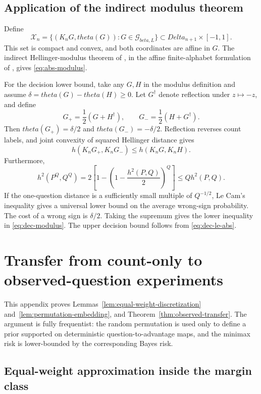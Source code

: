 \documentclass[11pt]{article}
\def\beta{beta}%
\def\theta{theta}%
\def\Delta{Delta}%
\newcommand{\calG}{\mathcal G}
\begin{document}
\subsection{Application of the indirect modulus theorem}

Define
\[
\mathcal X_n
=
\{(K_nG,\theta(G)):G\in\calG_{\beta,L}\}
\subset\Delta_{n+1}\times[-1,1].
\]
This set is compact and convex, and both coordinates are affine in $G$.  The indirect Hellinger-modulus theorem of \citet{DonohoLiuII}, in the affine finite-alphabet formulation of \citet{JuditskyNemirovski}, gives \eqref{eq:abs-modulus}.

For the decision lower bound, take any $G,H$ in the modulus definition and assume $\delta=\theta(G)-\theta(H)\ge0$.  Let $G^\dagger$ denote reflection under $z\mapsto-z$, and define
\[
G_+=\frac12(G+H^\dagger),
\qquad
G_-=\frac12(H+G^\dagger).
\]
Then $\theta(G_+)=\delta/2$ and $\theta(G_-)=-\delta/2$.  Reflection reverses count labels, and joint convexity of squared Hellinger distance gives
\[
h(K_nG_+,K_nG_-)
\le h(K_nG,K_nH).
\]
Furthermore,
\[
h^2(P^Q,Q^Q)
=2\left[1-\left(1-\frac{h^2(P,Q)}2\right)^Q\right]
\le Qh^2(P,Q).
\]
If the one-question distance is a sufficiently small multiple of $Q^{-1/2}$, Le Cam's inequality gives a universal lower bound on the average wrong-sign probability.  The cost of a wrong sign is $\delta/2$.  Taking the supremum gives the lower inequality in \eqref{eq:dec-modulus}.  The upper decision bound follows from \eqref{eq:dec-le-abs}.

\section{Transfer from count-only to observed-question experiments}
\label{app:observed-transfer}

This appendix proves Lemmas~\ref{lem:equal-weight-discretization} and~\ref{lem:permutation-embedding}, and Theorem~\ref{thm:observed-transfer}.  The argument is fully frequentist: the random permutation is used only to define a prior supported on deterministic question-to-advantage maps, and the minimax risk is lower-bounded by the corresponding Bayes risk.

\subsection{Equal-weight approximation inside the margin class}
\end{document}
